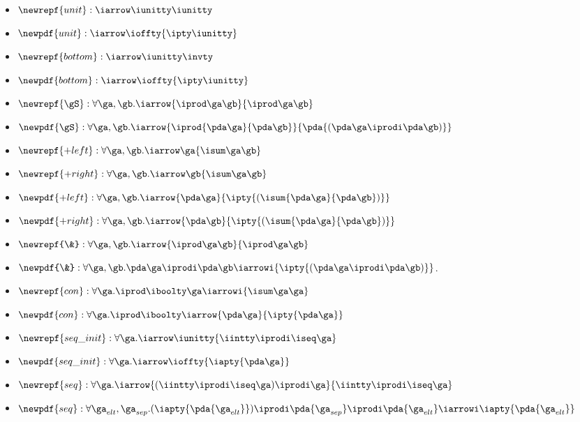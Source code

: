 \begin{lemma}
\label{lem:types-of-constructors}
\begin{itemize}
\item $\newrepf {unit} : \iarrow \iunitty \iunitty$
\item $\newpdf  {unit} : \iarrow \ioffty {\ipty \iunitty}$
\item $\newrepf {bottom} : \iarrow \iunitty \invty$
\item $\newpdf  {bottom} : \iarrow \ioffty {\ipty \iunitty}$
\item $\newrepf {\gS} : \forall \ga,\gb.\iarrow {\iprod \ga \gb} {\iprod \ga \gb}$
\item $\newpdf {\gS} : \forall \ga,\gb. 
  \iarrow {\iprod {\pda \ga} {\pda \gb}}
  {\pda {(\pda \ga \iprodi \pda \gb)}}
$
\item $\newrepf {+left} : \forall \ga, \gb.\iarrow \ga 
                            {\isum \ga \gb}$
\item $\newrepf {+right} : \forall \ga, \gb.\iarrow \gb {\isum \ga \gb}$
\item $\newpdf {+left} : \forall \ga, \gb.\iarrow {\pda \ga} 
  {\ipty {(\isum {\pda \ga}{\pda \gb})}}$
\item $\newpdf {+right} :\forall  \ga, \gb. \iarrow {\pda \gb} 
                            {\ipty {(\isum {\pda \ga} {\pda \gb})}}$
\item $\newrepf {\&} : \forall \ga,\gb.\iarrow {\iprod \ga \gb} {\iprod \ga \gb}$
\item $\newpdf {\&} : 
\forall \ga,\gb.
  \pda \ga \iprodi
  \pda \gb \iarrowi 
         {\ipty {(\pda \ga \iprodi \pda \gb)}}
$.
\item $\newrepf {con} : \forall \ga.\iprod \iboolty \ga 
  \iarrowi {\isum \ga \ga}$
\item $\newpdf {con} :\forall  \ga. \iprod \iboolty \iarrow {\pda \ga} {\ipty {\pda \ga}}$
\item $\newrepf {seq\_init} : \forall \ga.\iarrow \iunitty {\iintty \iprodi \iseq \ga}$
\item $\newpdf {seq\_init} : \forall \ga. \iarrow \ioffty {\iapty {\pda\ga}}$
\item $\newrepf {seq} : \forall \ga.\iarrow
  {(\iintty \iprodi \iseq \ga) \iprodi \ga}
  {\iintty \iprodi \iseq \ga}$
\item $\newpdf {seq} :\forall  {\ga_{elt}},{\ga_{sep}}. 
  (\iapty {\pda {\ga_{elt}}}) \iprodi
  \pda {\ga_{sep}} \iprodi 
  \pda {\ga_{elt}} \iarrowi \\
  \iapty {\pda {\ga_{elt}}}$

\end{itemize}
\end{lemma}
